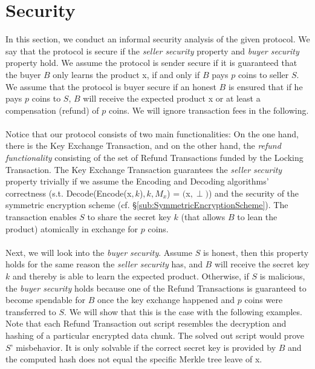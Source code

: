 \documentclass{cacthesis}
\newcounter{protocol}
\begin{document}
        \section{Security}
        \label{sec:Security}
        In this section, we conduct an informal security analysis of the given protocol. We say that the protocol is secure if the \textit{seller security} property and \textit{buyer security} property hold. We assume the protocol is sender secure if it is guaranteed that the buyer $B$ only learns the product \textsf{x}, if and only if $B$ pays $p$ coins to seller $S$. We assume that the protocol is buyer secure if an honest $B$ is ensured that if he pays $p$ coins to $S$, $B$ will receive the expected product \textsf{x} or at least a compensation (refund) of $p$ coins. We will ignore transaction fees in the following. \\\\
        Notice that our protocol consists of two main functionalities: On the one hand, there is the Key Exchange Transaction, and on the other hand, the \textit{refund functionality} consisting of the set of Refund Transactions funded by the Locking Transaction. The Key Exchange Transaction guarantees the \textit{seller security} property trivially if we assume the \textsf{Encoding} and \textsf{Decoding} algorithms' correctness (s.t. \textsf{Decode(Encode(}\textsf{x$, k$)}$, k, M_x$\textsf{)} = $($\textsf{x}$, \perp)$) and the security of the symmetric encryption scheme (cf. §\ref{sub:SymmetricEncryptionScheme}). The transaction enables $S$ to share the secret key $k$ (that allows $B$ to lean the product) atomically in exchange for $p$ coins. \\\\
        Next, we will look into the \textit{buyer security}. Assume $S$ is honest, then this property holds for the same reason the \textit{seller security} has, and $B$ will receive the secret key $k$ and thereby is able to learn the expected product. Otherwise, if $S$ is malicious, the \textit{buyer security} holds because one of the Refund Transactions is guaranteed to become spendable for $B$ once the key exchange happened and $p$ coins were transferred to $S$. We will show that this is the case with the following examples. Note that each Refund Transaction out script resembles the decryption and hashing of a particular encrypted data chunk. The solved out script would prove $S$' misbehavior. It is only solvable if the correct secret key is provided by $B$ and the computed hash does not equal the specific Merkle tree leave of \textsf{x}.
\end{document}

